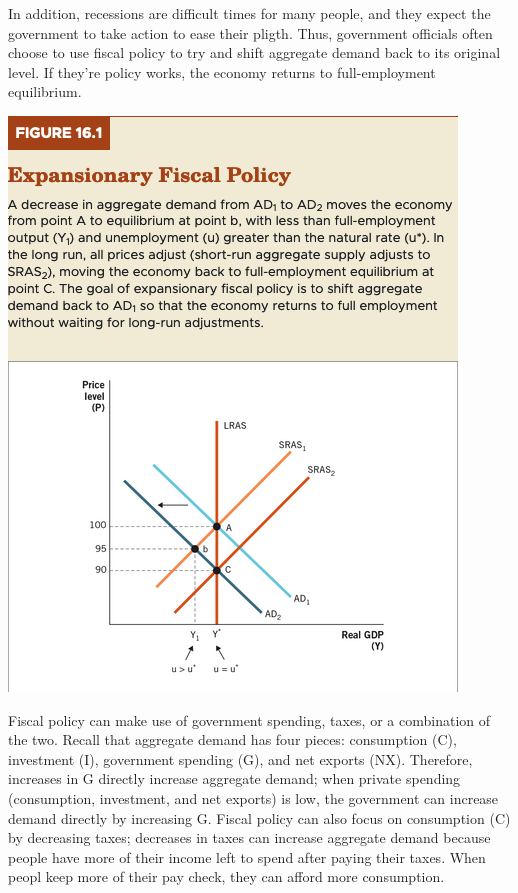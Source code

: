 \documentclass[11pt]{article} %
\begin{document}
In addition, recessions are difficult times for many people, and they expect the government to take action to ease their pligth. Thus, government officials often choose to use fiscal policy to try and shift aggregate demand back to its original level. If they're policy works, the economy returns to full-employment equilibrium.
\begin{center}
\includegraphics[scale=0.5]{images/Figure 16.1.png} 
\end{center}
Fiscal policy can make use of government spending, taxes, or a combination of the two. Recall that aggregate demand has four pieces: consumption (C), investment (I), government spending (G), and net exports (NX). Therefore, increases in G directly increase aggregate demand; when private spending (consumption, investment, and net exports) is low, the government can increase demand directly by increasing G. Fiscal policy can also focus on consumption (C) by decreasing taxes; decreases in taxes can increase aggregate demand because people have more of their income left to spend after paying their taxes. When peopl keep more of their pay check, they can afford more consumption.
\end{document}
